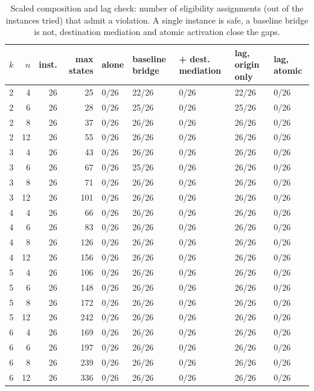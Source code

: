 \begin{table}[t]
\centering\small
\caption{Scaled composition and lag check: number of eligibility assignments (out of the instances tried) that admit a violation. A single instance is safe, a baseline bridge is not, destination mediation and atomic activation close the gaps.}
\label{tab:scaled}
\begin{tabular}{rrrrlllll}
\toprule
$k$ & $n$ & inst. & max states & alone & baseline bridge & + dest. mediation & lag, origin only & lag, atomic \\
\midrule
2 & 4 & 26 & 25 & 0/26 & 22/26 & 0/26 & 22/26 & 0/26 \\
2 & 6 & 26 & 28 & 0/26 & 25/26 & 0/26 & 25/26 & 0/26 \\
2 & 8 & 26 & 37 & 0/26 & 26/26 & 0/26 & 26/26 & 0/26 \\
2 & 12 & 26 & 55 & 0/26 & 26/26 & 0/26 & 26/26 & 0/26 \\
3 & 4 & 26 & 43 & 0/26 & 26/26 & 0/26 & 26/26 & 0/26 \\
3 & 6 & 26 & 67 & 0/26 & 25/26 & 0/26 & 26/26 & 0/26 \\
3 & 8 & 26 & 71 & 0/26 & 26/26 & 0/26 & 26/26 & 0/26 \\
3 & 12 & 26 & 101 & 0/26 & 26/26 & 0/26 & 26/26 & 0/26 \\
4 & 4 & 26 & 66 & 0/26 & 26/26 & 0/26 & 26/26 & 0/26 \\
4 & 6 & 26 & 83 & 0/26 & 26/26 & 0/26 & 26/26 & 0/26 \\
4 & 8 & 26 & 126 & 0/26 & 26/26 & 0/26 & 26/26 & 0/26 \\
4 & 12 & 26 & 156 & 0/26 & 26/26 & 0/26 & 26/26 & 0/26 \\
5 & 4 & 26 & 106 & 0/26 & 26/26 & 0/26 & 26/26 & 0/26 \\
5 & 6 & 26 & 148 & 0/26 & 26/26 & 0/26 & 26/26 & 0/26 \\
5 & 8 & 26 & 172 & 0/26 & 26/26 & 0/26 & 26/26 & 0/26 \\
5 & 12 & 26 & 242 & 0/26 & 26/26 & 0/26 & 26/26 & 0/26 \\
6 & 4 & 26 & 169 & 0/26 & 26/26 & 0/26 & 26/26 & 0/26 \\
6 & 6 & 26 & 197 & 0/26 & 26/26 & 0/26 & 26/26 & 0/26 \\
6 & 8 & 26 & 239 & 0/26 & 26/26 & 0/26 & 26/26 & 0/26 \\
6 & 12 & 26 & 336 & 0/26 & 26/26 & 0/26 & 26/26 & 0/26 \\
\bottomrule
\end{tabular}
\end{table}
